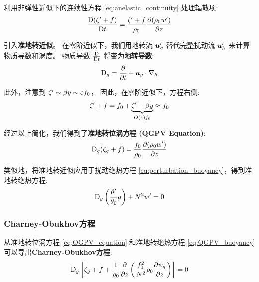 利用非弹性近似下的连续性方程 \eqref{eq:anelastic_continuity} 处理辐散项:
\begin{equation*}
    \matderiv{(\relvort^\prime + \coriolis)} = \frac{\relvort^\prime + \coriolis}{\density_0} \pde{(\density_0 w^\prime)}{z}
\end{equation*}

引入\textbf{准地转近似}。
在零阶近似下，我们用地转流 $\bm{u}_g^\prime$ 替代完整扰动流 $\bm{u}_h^\prime$ 来计算物质导数和涡度。
物质导数 $\frac{\mathrm{D} }{\mathrm{D} t}$ 将变为\textbf{地转导数}:
\begin{equation*}
    \mathrm{D}_g = \pde{}{\timevar} + \vel_g \cdot \nabla_h
\end{equation*}

此外，注意到 $\zeta^\prime \sim \beta y \sim\varepsilon f_0$，
因此，在零阶近似下，方程右侧:
\begin{equation*}
    \zeta^\prime + f = f_0 + \underbrace{\zeta^\prime + \beta y}_{O(\varepsilon)f_0} \approx f_0
\end{equation*}

经过以上简化，我们得到了\textbf{准地转位涡方程 (QGPV Equation)}:
\begin{equation}
    \mathrm{D}_g (\relvort_g + \coriolis) = \frac{\coriolis_0}{\density_0} \pde{(\density_0 w^\prime)}{z}
    \label{eq:QGPV_equation}
\end{equation}

类似地，将准地转近似应用于扰动绝热方程 \eqref{eq:perturbation_buoyancy}，得到准地转绝热方程:
\begin{equation}
    \mathrm{D}_g \left(\frac{\theta^\prime}{\theta_0} g\right) + N^2 w^\prime = 0
    \label{eq:QGPV_buoyancy}
\end{equation}

\subsubsection{Charney-Obukhov方程}

从准地转位涡方程 \eqref{eq:QGPV_equation} 和准地转绝热方程 \eqref{eq:QGPV_buoyancy} 可以导出\textbf{Charney-Obukhov方程}:
\begin{equation}
    \mathrm{D}_g \left[\relvort_g + \coriolis + \frac{1}{\density_0} \pde{}{z}\left(\frac{\coriolis_0^2}{\bvfreq^2} \density_0 \pde{\streamfunc_g}{z}\right)\right] = 0
    \label{eq:Charney_Obukhov_equation}
\end{equation}

